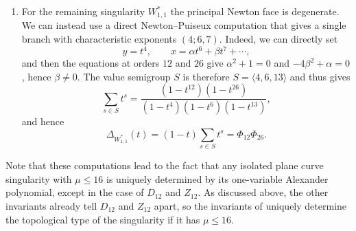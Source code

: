 \begin{enumerate}[label=$(\alph*)$]
All the remaining singularities $f:\C^2\lr\C$, except for $W_{1,1}^*$ which has a degenerate Newton polygon, can be computed via \cite{Varchenko1976}. Specifically, for a planar representative whose Newton boundary is nondegenerate, \cite{Varchenko1976} gives the zeta function (and thus the Alexander polynomial) directly from the compact Newton edges. In dimension two, if an edge $e$ has primitive positive inward normal $(a_e,b_e)$, with $a_e i+b_ej=N_e$, and lattice length $\ell_e$, the specialization gives
\begin{equation}\label{eq:Newton2D}
\Delta_f(t)
=(1-t)\,
\frac{\prod_e(1-t^{N_e})^{\ell_e}}
{\prod_{\text{vertices }(m,0)}(1-t^m)
 \prod_{\text{vertices }(0,n)}(1-t^n)}.
\end{equation}
This gives the Alexander polynomials for $E_7,E_{13},Z_{11},Z_{12},Z_{13},W_{13},Z_{1,0},Z_{1,1}$ and $W_{1,1}$. For instance, consider
\[
Z_{1,1}\quad \mbox{ with }\quad  f(x,y)=x^3y+x^2y^3+y^8.
\]
Then the compact edges are $(3,1)\to(2,3)$ and $(2,3)\to(0,8)$, with Newton multiplicities $7$ and $16$ and lattice lengths $1,1$.  Thus
\[
\Delta_{Z_{1,1}}(t)
=(1-t)\frac{(1-t^7)(1-t^{16})}{1-t^8}
=\Phi_1^2\Phi_7\Phi_{16}.
\]

\item For the remaining singularity $W^*_{1,1}$ the principal Newton face is degenerate. We can instead use a direct Newton--Puiseux computation that gives a single branch with characteristic exponents $(4;6,7)$. Indeed, we can directly set
\[
y=t^4,\qquad x=\alpha t^6+\beta t^7+\cdots,
\]
and then the equations at orders $12$ and $26$ give $\alpha^2+1=0$ and $-4\beta^2+\alpha=0$, hence $\beta\ne0$.  The value semigroup $S$ is therefore $S=\langle4,6,13\rangle$ and \cite[Theorem 1]{CDGZ} thus gives
\[
\sum_{s\in S}t^s
=
\frac{(1-t^{12})(1-t^{26})}
{(1-t^4)(1-t^6)(1-t^{13})},
\]
and hence
\[
\Delta_{W^*_{1,1}}(t)
=(1-t)\sum_{s\in S}t^s
=\Phi_{12}\Phi_{26}.
\]
\end{enumerate}

\noindent Note that these computations lead to the fact that any isolated plane curve singularity with $\mu\leq16$ is uniquely determined by its one-variable Alexander polynomial, except in the case of $D_{12}$ and $Z_{12}$. As discussed above, the other invariants already tell $D_{12}$ and $Z_{12}$ apart, so the invariants of  uniquely determine the topological type of the singularity if it has $\mu\leq16$.

